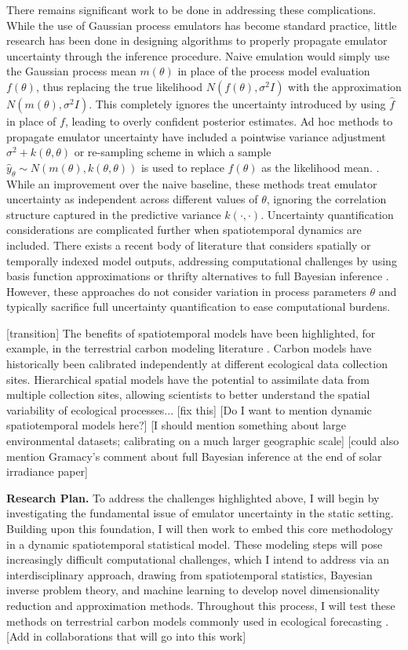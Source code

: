 \documentclass[12pt]{article}
\begin{document}
 There remains significant work to be done in addressing these complications. While the use of Gaussian process emulators has become standard practice, little research has been done in designing algorithms to properly propagate emulator uncertainty through the inference procedure. Naive emulation would simply use the Gaussian process mean $m(\theta)$ in place of the process model evaluation $f(\theta)$, thus replacing the true likelihood $N(f(\theta), \sigma^2 I)$
with the approximation $N(m(\theta), \sigma^2 I)$. This completely ignores the uncertainty introduced by using $\hat{f}$ in place of $f$, leading to overly confident posterior estimates. Ad hoc methods to propagate emulator uncertainty have included a pointwise variance adjustment 
$\sigma^2 + k(\theta, \theta)$ or re-sampling scheme in which a sample $\hat{y}_{\theta} \sim N(m(\theta), k(\theta, \theta))$ is used to replace $f(\theta)$ as the likelihood mean. \cite{Cleary, Fer}. While an improvement over the naive baseline, these methods treat emulator uncertainty as independent across different values of $\theta$, ignoring the correlation structure captured in the predictive variance $k(\cdot, \cdot)$. Uncertainty quantification considerations are complicated further when spatiotemporal dynamics are included. There exists a recent body of literature that considers spatially or temporally indexed model outputs, addressing computational challenges by using basis function approximations \cite{Fadikar} or thrifty alternatives to full Bayesian inference \cite{Sun}. However, these approaches do not consider variation in process parameters $\theta$ and typically sacrifice full uncertainty quantification to ease computational burdens. 

[transition] The benefits of spatiotemporal models have been
 highlighted, for example, in the terrestrial carbon modeling literature \cite{Fer2}. Carbon models have historically been calibrated independently at different 
 ecological data collection sites. Hierarchical spatial models have the potential to assimilate data from multiple collection sites, allowing scientists to better understand the spatial variability of ecological processes... [fix this] [Do I want to mention dynamic spatiotemporal models here?] 
 [I should mention something about large environmental datasets; calibrating on a much larger geographic scale]
 [could also mention Gramacy's comment about full Bayesian inference at the end of solar irradiance paper]

\noindent
\textbf{Research Plan.} To address the challenges highlighted above, I will begin by investigating the fundamental issue of emulator uncertainty in the 
static setting. Building upon this foundation, I will then work to embed this core methodology in a dynamic spatiotemporal statistical model. These modeling steps will pose increasingly difficult computational challenges, which I intend to address via an interdisciplinary approach, drawing from spatiotemporal statistics, Bayesian inverse problem theory, and machine learning to develop novel dimensionality reduction and approximation methods. Throughout this process, I will test these methods on terrestrial carbon models commonly used in ecological forecasting \cite{Dietze, Canadell}. [Add in collaborations that will go into this work]
 
\end{document}

